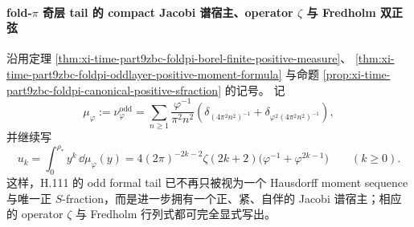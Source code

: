 \paragraph{fold-\texorpdfstring{$\pi$}{pi} 奇层 tail 的 compact Jacobi 谱宿主、operator \texorpdfstring{$\zeta$}{zeta} 与 Fredholm 双正弦}
沿用定理 \ref{thm:xi-time-part9zbc-foldpi-borel-finite-positive-measure}、
\ref{thm:xi-time-part9zbc-foldpi-oddlayer-positive-moment-formula}
与命题 \ref{prop:xi-time-part9zbc-foldpi-canonical-positive-sfraction} 的记号。
记
\[
\mu_\varphi:=\nu_{\varphi}^{\mathrm{odd}}
=
\sum_{n\ge 1}
\frac{\varphi^{-1}}{\pi^2n^2}
\left(
\delta_{(4\pi^2n^2)^{-1}}
+\delta_{\varphi^2(4\pi^2n^2)^{-1}}
\right),
\]
并继续写
\[
u_k=\int_0^{\rho_\ast}y^k\,\dd\mu_\varphi(y)
=
4(2\pi)^{-2k-2}\zeta(2k+2)\bigl(\varphi^{-1}+\varphi^{2k-1}\bigr)
\qquad (k\ge 0).
\]
这样，H.111 的 odd formal tail 已不再只被视为一个 Hausdorff moment sequence 与唯一正 \(S\)-fraction，而是进一步拥有一个正、紧、自伴的 Jacobi 谱宿主；相应的 operator \(\zeta\) 与 Fredholm 行列式都可完全显式写出。

